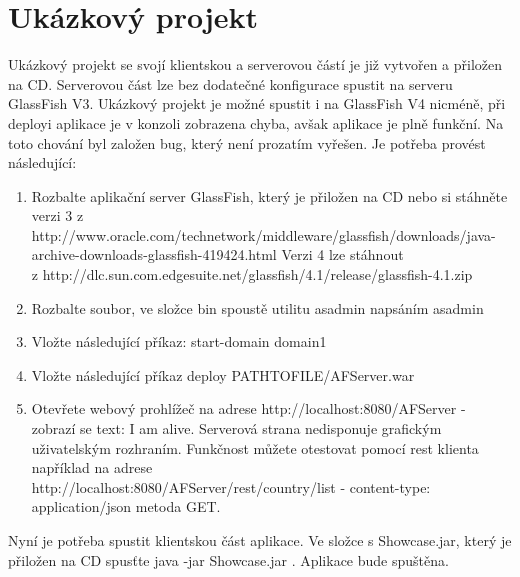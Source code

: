 \section{Ukázkový projekt}
Ukázkový projekt se svojí klientskou a serverovou částí je již vytvořen a přiložen na CD. Serverovou část lze bez dodatečné konfigurace spustit na serveru GlassFish V3. Ukázkový projekt je možné spustit i na GlassFish V4 nicméně, při deployi aplikace je v konzoli zobrazena chyba, avšak aplikace je plně funkční. Na toto chování byl založen bug, který není prozatím vyřešen. Je potřeba provést následující:
\begin{enumerate}
\item Rozbalte aplikační server GlassFish, který je přiložen na CD nebo si stáhněte verzi 3 z http://www.oracle.com/technetwork/middleware/glassfish/downloads/java-archive-downloads-glassfish-419424.html Verzi 4 lze stáhnout 
\\z http://dlc.sun.com.edgesuite.net/glassfish/4.1/release/glassfish-4.1.zip
\item Rozbalte soubor, ve složce bin spoustě utilitu asadmin napsáním asadmin
\item Vložte následující příkaz: start-domain domain1
\item Vložte následující příkaz deploy PATHTOFILE/AFServer.war
\item Otevřete webový prohlížeč na adrese http://localhost:8080/AFServer - zobrazí se text: I am alive. Serverová strana nedisponuje grafickým uživatelským rozhraním. Funkčnost můžete otestovat pomocí rest klienta například na adrese 
\\http://localhost:8080/AFServer/rest/country/list - content-type: application/json metoda GET.
\end{enumerate}
Nyní je potřeba spustit klientskou část aplikace. Ve složce s Showcase.jar, který je přiložen na CD spusťte java -jar Showcase.jar . Aplikace bude spuštěna.


